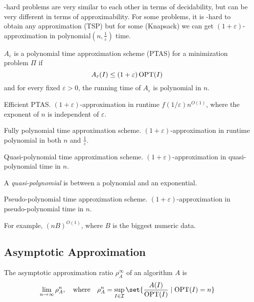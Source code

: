\NP-hard problems are very similar to each other in terms of decidability, but
can be very different in terms of approximability.
For some problems, it is \NP-hard to obtain any approximation (TSP) but for some
(Knapsack) we can get $(1+\varepsilon)$-approximation in
polynomial$(n, \frac1\varepsilon)$ time.

\begin{definition}
    $A_\varepsilon$ is a polynomial time approximation scheme (PTAS) for a
    minimization problem $\Pi$ if \[
        A_\varepsilon(I) \le (1+\varepsilon) \operatorname{OPT}(I)
    \]
    and for every fixed $\varepsilon > 0$, the running time of $A_\varepsilon$
    is polynomial in $n$.
\end{definition}
\begin{definition}[EPTAS] \label{def:approx:eptas}
    Efficient PTAS.
    $(1+\varepsilon)$-approximation in runtime $f(1 / \varepsilon) n^{O(1)}$,
    where the exponent of $n$ is independent of $\varepsilon$.
\end{definition}
\begin{definition}[FPTAS] \label{def:approx:fptas}
    Fully polynomial time approximation scheme.
    $(1+\varepsilon)$-approximation in runtime polynomial in both $n$ and
    $\frac1\varepsilon$.
\end{definition}
\begin{definition}[QPTAS] \label{def:approx:qptas}
    Quasi-polynomial time approximation scheme.
    $(1+\varepsilon)$-approximation in quasi-polynomial time in $n$.

    A \emph{quasi-polynomial} is between a polynomial and an exponential.
\end{definition}
\begin{definition}[PPTAS] \label{def:approx:pptas}
    Pseudo-polynomial time approximation scheme.
    $(1+\varepsilon)$-approximation in pseudo-polynomial time in $n$.

    For example, $(nB)^{O(1)}$, where $B$ is the biggest numeric data.
\end{definition}

\subsection{Asymptotic Approximation} \label{sec:asymptotic_approximation}
\begin{definition}
    The asymptotic approximation ratio $\rho_A^\infty$ of an algorithm $A$ is \[
        \lim_{n \to \infty} \rho_A^n, \quad \text{where} \quad
        \rho_A^n = \sup_{I \in \mathcal{I}} \set{\frac{A(I)}{\OPT(I)} \large\mid
        \OPT(I) = n}
    \]
\end{definition}


